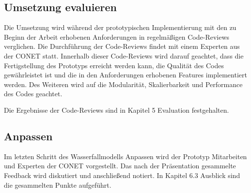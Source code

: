 \subsection{Umsetzung evaluieren}
Die Umsetzung wird während der prototypischen Implementierung mit den zu Beginn der Arbeit erhobenen Anforderungen in regelmäßigen Code-Reviews verglichen. Die Durchführung der Code-Reviews findet mit einem Experten aus der CONET statt. Innerhalb dieser Code-Reviews wird darauf geachtet, dass die Fertigstellung des Prototyps erreicht werden kann, die Qualität des Codes gewährleistet ist und die in den Anforderungen erhobenen Features implementiert werden. Des Weiteren wird auf die Modularität, Skalierbarkeit und Performance des Codes geachtet.

Die Ergebnisse der Code-Reviews sind in Kapitel 5 \glqq Evaluation\grqq{} festgehalten. 

\subsection{Anpassen}
Im letzten Schritt des Wasserfallmodells \glqq Anpassen\grqq{} wird der Prototyp Mitarbeiten und Experten der CONET vorgestellt. Das nach der Präsentation gesammelte Feedback wird diskutiert und anschließend notiert. In Kapitel 6.3 \glqq Ausblick\grqq{} sind die gesammelten Punkte aufgeführt. 